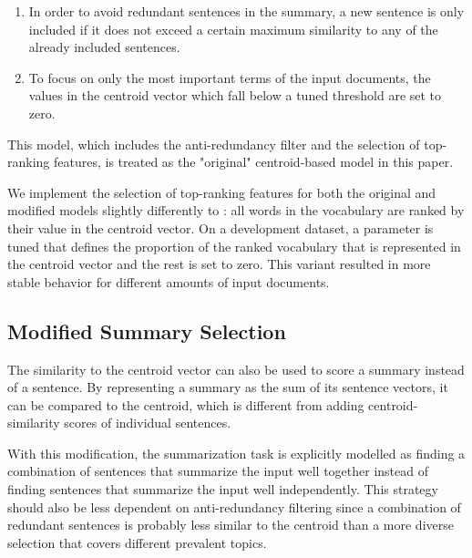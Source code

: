 \documentclass[11pt,letterpaper]{article}
\begin{document}
\begin{enumerate}
	\item In order to avoid redundant sentences in the summary, a new sentence is only included if it does not exceed a certain maximum similarity to any of the already included sentences. 
	\item To focus on only the most important terms of the input documents, the values in the centroid vector which fall below a tuned threshold are set to zero.
\end{enumerate}
This model, which includes the anti-redundancy filter and the selection of top-ranking features, is treated as the "original" centroid-based model in this paper.

We implement the selection of top-ranking features for both the original and modified models slightly differently to \citet{Rossiello2017CentroidbasedTS}: all words in the vocabulary are ranked by their value in the centroid vector. On a development dataset, a parameter is tuned that defines the proportion of the ranked vocabulary that is represented in the centroid vector and the rest is set to zero. This variant resulted in more stable behavior for different amounts of input documents. 
\subsection{Modified Summary Selection}
The similarity to the centroid vector can also be used to score a summary instead of a sentence. By representing a summary as the sum of its sentence vectors, it can be compared to the centroid, which is different from adding centroid-similarity scores of individual sentences.

With this modification, the summarization task is explicitly modelled as finding a combination of sentences that summarize the input well together instead of finding sentences that summarize the input well independently. This strategy should also be less dependent on anti-redundancy filtering since a combination of redundant sentences is probably less similar to the centroid than a more diverse selection that covers different prevalent topics.
\end{document}
